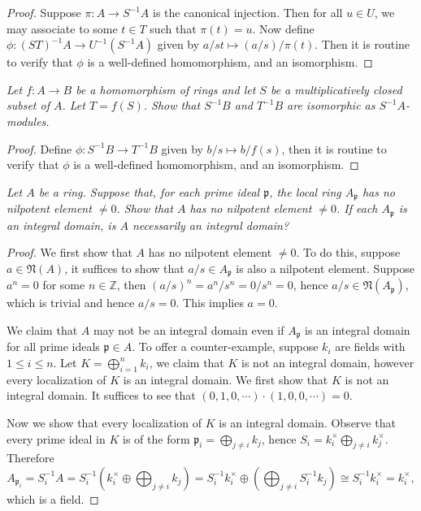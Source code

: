 \begin{proof}
Suppose $\pi:A\to S^{-1}A$ is the canonical injection. Then for all $u\in U$, we may associate to some $t\in T$ such that $\pi(t)=u$. Now define $\phi:(ST)^{-1}A\to U^{-1}(S^{-1}A)$ given by $a/st\mapsto(a/s)/\pi(t)$. Then it is routine to verify that $\phi$ is a well-defined homomorphism, and an isomorphism.
\end{proof}
\begin{problem}\em
Let $f:A\to B$ be a homomorphism of rings and let $S$ be a multiplicatively closed subset of $A$. Let $T=f(S)$. Show that $S^{-1}B$ and $T^{-1}B$ are isomorphic as $S^{-1}A$-modules.
\end{problem}
\begin{proof}
Define $\phi:S^{-1}B\to T^{-1}B$ given by $b/s\mapsto b/f(s)$, then it is routine to verify that $\phi$ is a well-defined homomorphism, and an isomorphism.
\end{proof}
\begin{problem}\em
Let $A$ be a ring. Suppose that, for each prime ideal $\mathfrak{p}$, the local ring $A_\mathfrak{p}$ has no nilpotent element $\ne 0$. Show that $A$ has no nilpotent element $\ne 0$. If each $A_\mathfrak{p}$ is an integral domain, is $A$ necessarily an integral domain?
\end{problem}
\begin{proof}
We first show that $A$ has no nilpotent element $\ne 0$. To do this, suppose $a\in\mathfrak{N}(A)$, it suffices to show that $a/s\in A_\mathfrak{p}$ is also a nilpotent element. Suppose $a^n=0$ for some $n\in\mathbb{Z}$, then $(a/s)^n=a^n/s^n=0/s^n=0$, hence $a/s\in\mathfrak{N}(A_\mathfrak{p})$, which is trivial and hence $a/s=0$. This implies $a=0$.\par
We claim that $A$ may not be an integral domain even if $A_\mathfrak{p}$ is an integral domain for all prime ideals $\mathfrak{p}\in A$. To offer a counter-example, suppose $k_i$ are fields with $1\le i\le n$. Let $K=\bigoplus_{i=1}^nk_i$, we claim that $K$ is not an integral domain, however every localization of $K$ is an integral domain. We first show that $K$ is not an integral domain. It suffices to see that $(0,1,0,\cdots)\cdot(1,0,0,\cdots)=0$.\par
Now we show that every localization of $K$ is an integral domain. Observe that every prime ideal in $K$ is of the form $\mathfrak{p}_i=\bigoplus_{j\ne i}k_j$, hence $S_i=k_i^\times\bigoplus_{j\ne i}k_j^\times$. Therefore 
$$
A_{\mathfrak{p} _i}=S_{i}^{-1}A=S_{i}^{-1}\left( k_{i}^{\times}\oplus \bigoplus_{j\ne i}{k_j} \right) =S_{i}^{-1}k_{i}^{\times}\oplus \left( \bigoplus_{j\ne i}{S_{i}^{-1}k_j} \right) \cong S_{i}^{-1}k_{i}^{\times}=k_{i}^{\times},
$$
which is a field.
\end{proof}

